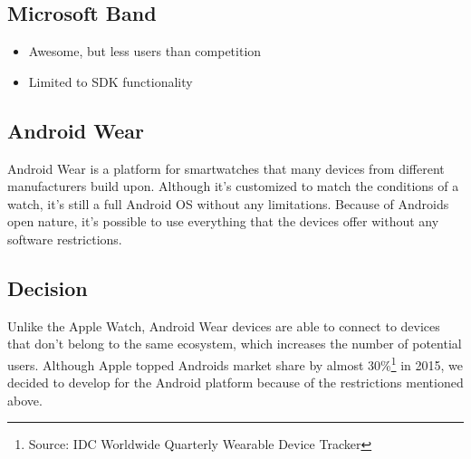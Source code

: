 \subsection{Microsoft Band}
\begin{itemize}[noitemsep]
	\item Awesome, but less users than competition
	\item Limited to SDK functionality
\end{itemize}

\subsection{Android Wear}
Android Wear is a platform for smartwatches that many devices from different manufacturers build upon.
Although it's customized to match the conditions of a watch, it's still a full Android OS without any limitations.
Because of Androids open nature, it's possible to use everything that the devices offer without any software restrictions.

\subsection{Decision}

Unlike the Apple Watch, Android Wear devices are able to connect to devices that don't belong to the same ecosystem, which increases the number of potential users. Although Apple topped Androids market share by almost 30\%\footnote{Source: IDC Worldwide Quarterly Wearable Device Tracker} in 2015, we decided to develop for the Android platform because of the restrictions mentioned above.

\clearpage